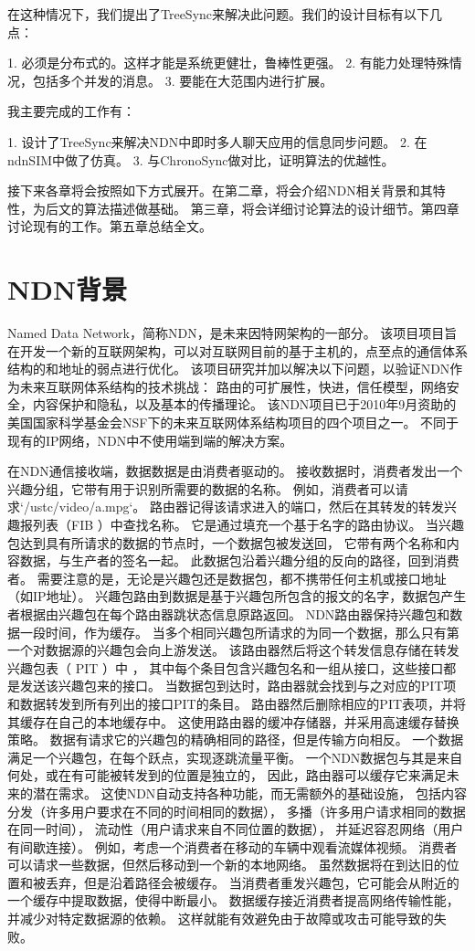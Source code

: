 \documentclass[a4paper]{article}
\begin{document}
在这种情况下，我们提出了TreeSync来解决此问题。我们的设计目标有以下几点：

1. 必须是分布式的。这样才能是系统更健壮，鲁棒性更强。
2. 有能力处理特殊情况，包括多个并发的消息。
3. 要能在大范围内进行扩展。

我主要完成的工作有：

1. 设计了TreeSync来解决NDN中即时多人聊天应用的信息同步问题。
2. 在ndnSIM中做了仿真。
3. 与ChronoSync做对比，证明算法的优越性。

接下来各章将会按照如下方式展开。在第二章，将会介绍NDN相关背景和其特性，为后文的算法描述做基础。
第三章，将会详细讨论算法的设计细节。第四章讨论现有的工作。第五章总结全文。

\section{NDN背景}

Named Data Network，简称NDN，是未来因特网架构的一部分。
该项目项目旨在开发一个新的互联网架构，可以对互联网目前的基于主机的，点至点的通信体系结构的和地址的弱点进行优化。
该项目研究并加以解决以下问题，以验证NDN作为未来互联网体系结构的技术挑战：
路由的可扩展性，快进，信任模型，网络安全，内容保护和隐私，以及基本的传播理论。
该NDN项目已于2010年9月资助的美国国家科学基金会NSF下的未来互联网体系结构项目的四个项目之一。
不同于现有的IP网络，NDN中不使用端到端的解决方案。

在NDN通信接收端，数据数据是由消费者驱动的。
接收数据时，消费者发出一个兴趣分组，它带有用于识别所需要的数据的名称。
例如，消费者可以请求`/ustc/video/a.mpg`。
路由器记得该请求进入的端口，然后在其转发的转发兴趣报列表（FIB ）中查找名称。
它是通过填充一个基于名字的路由协议。
当兴趣包达到具有所请求的数据的节点时，一个数据包被发送回，
它带有两个名称和内容数据，与生产者的签名一起。
此数据包沿着兴趣分组的反向的路径，回到消费者。
需要注意的是，无论是兴趣包还是数据包，都不携带任何主机或接口地址（如IP地址）。
兴趣包路由到数据是基于兴趣包所包含的报文的名字，数据包产生者根据由兴趣包在每个路由器跳状态信息原路返回。
NDN路由器保持兴趣包和数据一段时间，作为缓存。
当多个相同兴趣包所请求的为同一个数据，那么只有第一个对数据源的兴趣包会向上游发送。
该路由器然后将这个转发信息存储在转发兴趣包表（ PIT ）中 ，
其中每个条目包含兴趣包名和一组从接口，这些接口都是发送该兴趣包来的接口。
当数据包到达时，路由器就会找到与之对应的PIT项和数据转发到所有列出的接口PIT的条目。
路由器然后删除相应的PIT表项，并将其缓存在自己的本地缓存中。
这使用路由器的缓冲存储器，并采用高速缓存替换策略。
数据有请求它的兴趣包的精确相同的路径，但是传输方向相反。
一个数据满足一个兴趣包，在每个跃点，实现逐跳流量平衡。
一个NDN数据包与其是来自何处，或在有可能被转发到的位置是独立的，
因此，路由器可以缓存它来满足未来的潜在需求。
这使NDN自动支持各种功能，而无需额外的基础设施，
包括内容分发（许多用户要求在不同的时间相同的数据），
多播（许多用户请求相同的数据在同一时间），
流动性（用户请求来自不同位置的数据），
并延迟容忍网络（用户有间歇连接）。
例如，考虑一个消费者在移动的车辆中观看流媒体视频。
消费者可以请求一些数据，但然后移动到一个新的本地网络。
虽然数据将在到达旧的位置和被丢弃，但是沿着路径会被缓存。
当消费者重发兴趣包，它可能会从附近的一个缓存中提取数据，使得中断最小。
数据缓存接近消费者提高网络传输性能，并减少对特定数据源的依赖。
这样就能有效避免由于故障或攻击可能导致的失败。
\end{document}
